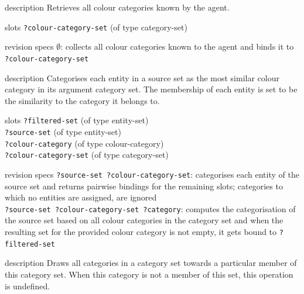 
\begin{explanation}{description}
  Retrieves all colour categories known by the agent.
\end{explanation}

\begin{explanation}{slots}
  \verb+?colour-category-set+ (of type category-set)
\end{explanation}

\begin{explanation}{revision specs}
  $\emptyset$: collects all colour categories known to the agent and
  binds it to \verb+?colour-category-set+
\end{explanation}


\begin{explanation}{description}
  Categorises each entity in a source set as the most similar colour
  category in its argument category set. The membership of each entity
  is set to be the similarity to the category it belongs to.
\end{explanation}

\begin{explanation}{slots}
  \verb+?filtered-set+ (of type entity-set) \\
  \verb+?source-set+ (of type entity-set) \\
  \verb+?colour-category+ (of type colour-category) \\
  \verb+?colour-category-set+ (of type category-set)
\end{explanation}

\begin{explanation}{revision specs}
  \verb+?source-set ?colour-category-set+: categorises each entity of
  the source set and returns pairwise bindings for the remaining
  slots; categories to which no entities are assigned, are ignored \\
  \verb+?source-set ?colour-category-set ?category+: computes the
  categorisation of the source set based on all colour categories in
  the category set and when the resulting set for the provided colour
  category is not empty, it gets bound to \verb+?filtered-set+
\end{explanation}


\begin{explanation}{description}
  Draws all categories in a category set towards a particular member
  of this category set. When this category is not a member of this
  set, this operation is undefined.
\end{explanation}

